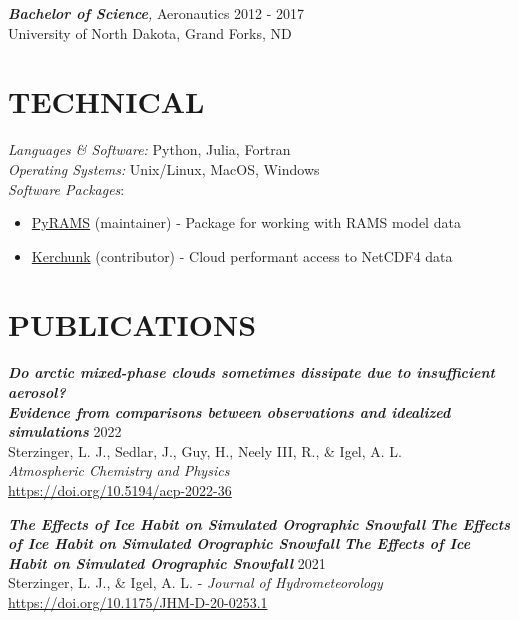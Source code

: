 \documentclass[overlapped]{res}
\begin{document}
\begin{resume}
                {\sl \textbf{Bachelor of Science},} Aeronautics 
                \hfill 2012 - 2017 \\
                University of North Dakota, Grand Forks, ND

\section{TECHNICAL} 
                {\sl Languages \& Software:} Python, Julia, Fortran \\
                {\sl Operating Systems:} Unix/Linux, MacOS, Windows\\
                {\sl Software Packages}:
                    \begin{itemize}
                        \item \href{https://github.com/lsterzinger/pyrams}{PyRAMS} (maintainer) - Package for working with RAMS model data
                        \item \href{https://github.com/fsspec/kerchunk}{Kerchunk} (contributor) - Cloud performant access to NetCDF4 data
                    \end{itemize}
                
\section{PUBLICATIONS}

    {\sl \textbf{Do arctic mixed-phase clouds sometimes dissipate due to insufficient aerosol?\\Evidence from comparisons between observations and idealized simulations}}
    \hfill 2022 \\ Sterzinger, L. J., Sedlar, J., Guy, H., Neely III, R., \& Igel, A. L. \\ \textit{Atmospheric Chemistry and Physics} \\ \href{https://doi.org/10.5194/acp-2022-36}{https://doi.org/10.5194/acp-2022-36}

    {\sl \textbf{The Effects of Ice Habit on Simulated Orographic Snowfall}} 
                    {\sl \textbf{The Effects of Ice Habit on Simulated Orographic Snowfall}} 
    {\sl \textbf{The Effects of Ice Habit on Simulated Orographic Snowfall}} 
    \hfill 2021 \\ Sterzinger, L. J., \& Igel, A. L. - \textit{Journal of Hydrometeorology} \\ \href{https://doi.org/10.1175/JHM-D-20-0253.1}{https://doi.org/10.1175/JHM-D-20-0253.1}


\end{resume}
\end{document}
